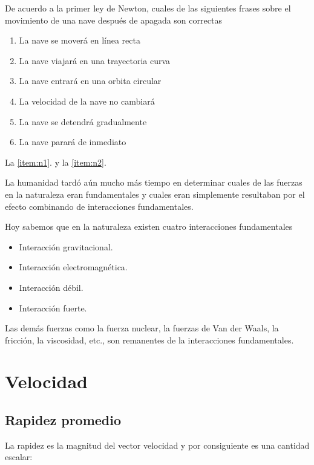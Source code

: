 \begin{frame}
  De acuerdo a la primer ley de Newton, cuales de las siguientes frases sobre el movimiento de una nave después de apagada son correctas
  \begin{enumerate}
  \item La nave se moverá en línea recta
    \label{item:n1}
  \item La nave viajará en una trayectoria curva
  \item La nave entrará en una orbita circular
  \item La velocidad de la nave no cambiará
    \label{item:n2}
  \item La nave se detendrá gradualmente
  \item La nave parará de inmediato
  \end{enumerate}
\end{frame}

La \ref{item:n1}. y la \ref{item:n2}.

La humanidad tardó aún mucho más tiempo en determinar cuales de las fuerzas en la naturaleza eran fundamentales y cuales eran simplemente resultaban por el efecto combinando de interacciones fundamentales.

Hoy sabemos que en la naturaleza existen cuatro interacciones fundamentales
\begin{itemize}
\item Interacción gravitacional.
\item Interacción electromagnética.
\item Interacción débil.
\item Interacción fuerte.
\end{itemize}

Las demás fuerzas como la fuerza nuclear, la fuerzas de Van der Waals, la fricción, la viscosidad, etc., son remanentes de la interacciones fundamentales. 


\section{Velocidad}

\subsection{Rapidez promedio}
La rapidez es la magnitud del vector velocidad  y por consiguiente es una cantidad escalar:

